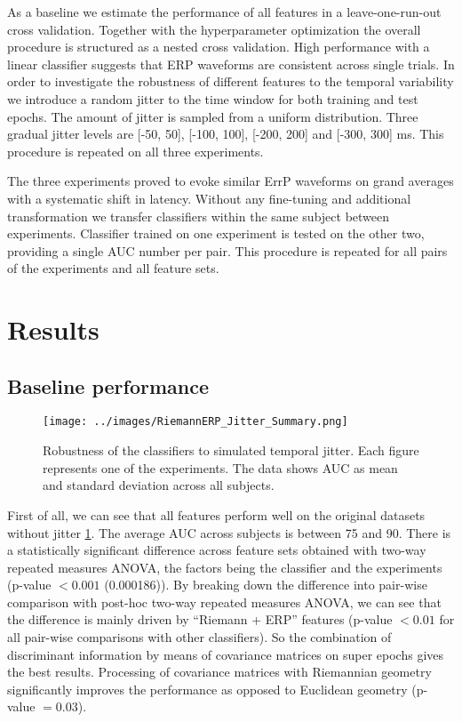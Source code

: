 \documentclass[12pt]{iopart}
\begin{document}
As a baseline we estimate the performance of all features in a leave-one-run-out cross validation.
Together with the hyperparameter optimization the overall procedure is structured as
a nested cross validation.
High performance with a linear classifier suggests that ERP waveforms are consistent
across single trials. In order to investigate the robustness of different features
to the temporal variability we introduce a random jitter to the time window
for both training and test epochs. The amount of jitter is sampled from a uniform distribution.
Three gradual jitter levels are [-50, 50], [-100, 100], [-200, 200] and [-300, 300] ms.
This procedure is repeated on all three experiments.

The three experiments proved to evoke similar ErrP waveforms on grand averages with a 
systematic shift in latency. Without any fine-tuning and additional
transformation we transfer classifiers within the same subject
between experiments. Classifier trained on one experiment
is tested on the other two, providing a single AUC number per pair.
This procedure is repeated for all pairs of the experiments and all feature sets.


\section{Results}
\label{sec:results}

\subsection{Baseline performance}

\begin{figure}[!t]
    \texttt{[image: ../images/RiemannERP\_Jitter\_Summary.png]}
\caption{Robustness of the classifiers to simulated temporal jitter.
    Each figure represents one of the experiments. The data shows
    AUC as mean and standard deviation across all subjects.}
\label{fig:jitter}
\end{figure}

First of all, we can see that all features perform well on the
original datasets without jitter \ref{fig:jitter}. The average AUC across subjects is between 75 and 90.
There is a statistically significant difference across feature sets obtained with two-way repeated
measures ANOVA, the factors being the classifier and the experiments (p-value $< 0.001$
(0.000186)). By breaking down the difference into pair-wise comparison with post-hoc
two-way repeated measures ANOVA, we can see that the difference is mainly driven by
``Riemann + ERP'' features (p-value $< 0.01$ for all pair-wise comparisons with other
classifiers). So the combination of discriminant information by means
of covariance matrices on super epochs gives the best results. Processing of
covariance matrices with Riemannian geometry significantly improves the performance
as opposed to Euclidean geometry (p-value $= 0.03$).
\end{document}
